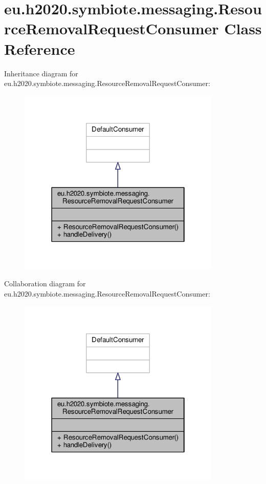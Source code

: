 \hypertarget{classeu_1_1h2020_1_1symbiote_1_1messaging_1_1ResourceRemovalRequestConsumer}{}\section{eu.\+h2020.\+symbiote.\+messaging.\+Resource\+Removal\+Request\+Consumer Class Reference}
\label{classeu_1_1h2020_1_1symbiote_1_1messaging_1_1ResourceRemovalRequestConsumer}


Inheritance diagram for eu.\+h2020.\+symbiote.\+messaging.\+Resource\+Removal\+Request\+Consumer\+:
\nopagebreak
\begin{figure}[H]
\begin{center}
\leavevmode
\includegraphics[width=274pt]{classeu_1_1h2020_1_1symbiote_1_1messaging_1_1ResourceRemovalRequestConsumer__inherit__graph}
\end{center}
\end{figure}


Collaboration diagram for eu.\+h2020.\+symbiote.\+messaging.\+Resource\+Removal\+Request\+Consumer\+:
\nopagebreak
\begin{figure}[H]
\begin{center}
\leavevmode
\includegraphics[width=274pt]{classeu_1_1h2020_1_1symbiote_1_1messaging_1_1ResourceRemovalRequestConsumer__coll__graph}
\end{center}
\end{figure}
